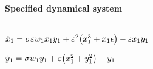 
\(\)
\paragraph{Specified dynamical system}
\(
\)\par

\(\dot x_{1}=\sigma  \varepsilon w_{1} x_{1} y_{1}+\varepsilon^{2} \big(x_{1}^{3}+x_{1} 
\epsilon \big)-\varepsilon x_{1} y_{1}
\)\par

\(\dot y_{1}=\sigma  w_{1} y_{1}+\varepsilon \big(x_{1}^{2}+y_{1}^{2}\big)-y_{1}
\)\par
